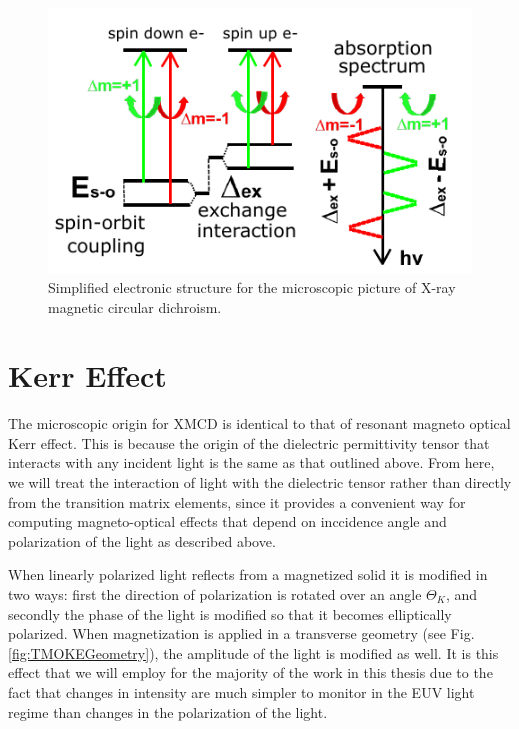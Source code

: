 \begin{figure}
\begin{center}
	\includegraphics[width=150mm]{figs/XMCDMicroscopic.pdf}
\end{center}
\caption{Simplified electronic structure for the microscopic picture of X-ray magnetic circular dichroism. }
\label{XMCDMicroscopic}
\end{figure}

\section{Kerr Effect}

The microscopic origin for XMCD is identical to that of resonant magneto optical Kerr effect. This is because the origin of the dielectric permittivity tensor that interacts with any incident light is the same as that outlined above. From here, we will treat the interaction of light with the dielectric tensor rather than directly from the transition matrix elements, since it provides a convenient way for computing magneto-optical effects that depend on inccidence angle and polarization of the light as described above.

When linearly polarized light reflects from a magnetized solid it is modified in two ways: first the direction of polarization is rotated over an angle $\Theta_K$, and secondly the phase of the light is modified so that it becomes elliptically polarized. When magnetization is applied in a transverse geometry (see Fig. \ref{fig:TMOKEGeometry}), the amplitude of the light is modified as well. It is this effect that we will employ for the majority of the work in this thesis due to the fact that changes in intensity are much simpler to monitor in the EUV light regime than changes in the polarization of the light.

